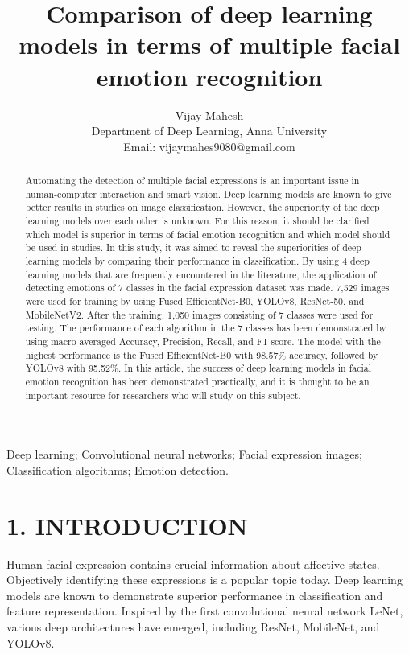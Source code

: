 \documentclass[journal,10pt]{IEEEtran}
\begin{document}
\title{Comparison of deep learning models in terms of multiple facial emotion recognition}
\author{Vijay Mahesh\\Department of Deep Learning, Anna University\\Email: vijaymahes9080@gmail.com}
\maketitle

\begin{abstract}
Automating the detection of multiple facial expressions is an important issue in human-computer interaction and smart vision. Deep learning models are known to give better results in studies on image classification. However, the superiority of the deep learning models over each other is unknown. For this reason, it should be clarified which model is superior in terms of facial emotion recognition and which model should be used in studies. In this study, it was aimed to reveal the superiorities of deep learning models by comparing their performance in classification. By using 4 deep learning models that are frequently encountered in the literature, the application of detecting emotions of 7 classes in the facial expression dataset was made. 7,529 images were used for training by using Fused EfficientNet-B0, YOLOv8, ResNet-50, and MobileNetV2. After the training, 1,050 images consisting of 7 classes were used for testing. The performance of each algorithm in the 7 classes has been demonstrated by using macro-averaged Accuracy, Precision, Recall, and F1-score. The model with the highest performance is the Fused EfficientNet-B0 with 98.57\% accuracy, followed by YOLOv8 with 95.52\%. In this article, the success of deep learning models in facial emotion recognition has been demonstrated practically, and it is thought to be an important resource for researchers who will study on this subject.
\end{abstract}

\begin{IEEEkeywords}
Deep learning; Convolutional neural networks; Facial expression images; Classification algorithms; Emotion detection.
\end{IEEEkeywords}

\section{1. INTRODUCTION}
Human facial expression contains crucial information about affective states. Objectively identifying these expressions is a popular topic today. Deep learning models are known to demonstrate superior performance in classification and feature representation. Inspired by the first convolutional neural network LeNet, various deep architectures have emerged, including ResNet, MobileNet, and YOLOv8. 
\end{document}
